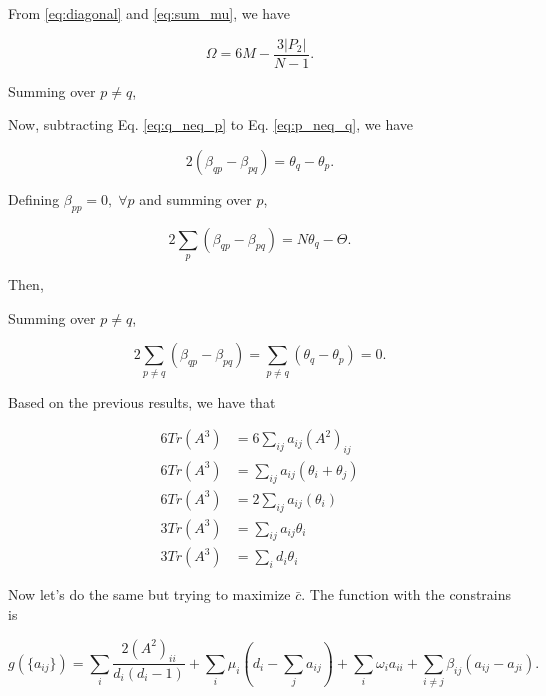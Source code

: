 \documentclass{article}
\begin{document}
From \ref{eq:diagonal} and \ref{eq:sum_mu}, we have 

\begin{equation}
    \Omega = 6M - \dfrac{3 |P_2|}{N-1}.
\end{equation}



Summing over $p\neq q$,



Now, subtracting Eq. \ref{eq:q_neq_p} to Eq. \ref{eq:p_neq_q}, we have

\begin{equation}\label{eq:betas}
     2 (\beta_{qp} - \beta_{pq}) = \theta_q - \theta_p.
\end{equation}

Defining $\beta_{pp} = 0,\;\forall p$ and summing over $p$,

\begin{equation}
    2 \sum_p (\beta_{qp}-\beta_{pq}) = N\theta_q - \Theta.
\end{equation}

Then,


Summing over $p \neq q$,

\begin{equation}
    2 \sum_{p\neq q} (\beta_{qp} - \beta_{pq}) = \sum_{p\neq q} (\theta_q - \theta_p) = 0.
\end{equation}

Based on the previous results, we have that

\begin{align}
    6 Tr(A^3) &= 6 \sum_{ij} a_{ij} (A^2)_{ij} \nonumber \\
    6 Tr(A^3) &= \sum_{ij} a_{ij}(\theta_i + \theta_j) \nonumber \\
    6 Tr(A^3) &= 2\sum_{ij} a_{ij}(\theta_i) \nonumber \\
    3 Tr(A^3) &=  \sum_{i j} a_{ij}\theta_i \nonumber \\
    3 Tr(A^3) &=  \sum_{i} d_i\theta_i \nonumber 
\end{align}



Now let's do the same but trying to maximize $\bar{c}$. The function with the constrains is 

\begin{equation}
    g(\lbrace a_{ij} \rbrace) = \sum_{i} \dfrac{2 (A^2)_{ii}}{d_i (d_i-1)} + \sum_i \mu_i \left(d_i - \sum_j a_{ij} \right) + \sum_i \omega_i a_{ii} + \sum_{i\neq j} \beta_{ij} (a_{ij}-a_{ji}).
\end{equation}
\end{document}

